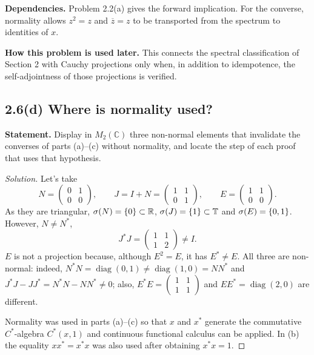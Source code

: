 \noindent\textbf{Dependencies.} Problem 2.2(a) gives the forward implication. For the converse, normality allows $z^2=z$ and $\overline z=z$ to be transported from the spectrum to identities of $x$.

\noindent\textbf{How this problem is used later.} This connects the spectral classification of Section 2 with Cauchy projections only when, in addition to idempotence, the self-adjointness of those projections is verified.

\subsection*{2.6(d) Where is normality used?}

\noindent\textbf{Statement.} Display in $M_2(\mathbb C)$ three non-normal elements that invalidate the converses of parts (a)--(c) without normality, and locate the step of each proof that uses that hypothesis.

\begin{proof}[Solution]
Let's take
\[
 N=\begin{pmatrix}0&1\\0&0\end{pmatrix},
 \qquad J=I+N=\begin{pmatrix}1&1\\0&1\end{pmatrix},
 \qquad E=\begin{pmatrix}1&1\\0&0\end{pmatrix}.
\]
As they are triangular, $\sigma(N)=\{0\}\subset\mathbb R$,
$\sigma(J)=\{1\}\subset\mathbb T$ and $\sigma(E)=\{0,1\}$.
However, $N\ne N^*$,
\[
 J^*J=\begin{pmatrix}1&1\\1&2\end{pmatrix}\ne I.
\]
$E$ is not a projection because, although $E^2=E$, it has $E^*\ne E$.
All three are non-normal: indeed,
$N^*N=\operatorname{diag}(0,1)\ne\operatorname{diag}(1,0)=NN^*$ and
$J^*J-JJ^*=N^*N-NN^*\ne0$; also,
$E^*E=\begin{pmatrix}1&1\\1&1\end{pmatrix}$ and
$EE^*=\operatorname{diag}(2,0)$ are different.

Normality was used in parts (a)--(c) so that $x$ and $x^*$ generate the
commutative $C^*$-algebra $C^*(x,1)$ and continuous functional calculus can be applied.
In (b) the equality $xx^*=x^*x$ was also used after obtaining $x^*x=1$.
\end{proof}

